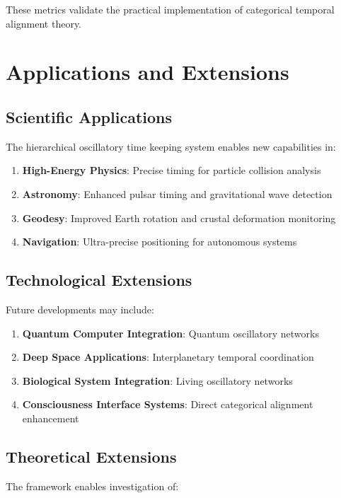 \documentclass[12pt,a4paper]{article}
\begin{document}
These metrics validate the practical implementation of categorical temporal alignment theory.

\section{Applications and Extensions}

\subsection{Scientific Applications}

The hierarchical oscillatory time keeping system enables new capabilities in:

\begin{enumerate}
\item \textbf{High-Energy Physics}: Precise timing for particle collision analysis
\item \textbf{Astronomy}: Enhanced pulsar timing and gravitational wave detection
\item \textbf{Geodesy}: Improved Earth rotation and crustal deformation monitoring
\item \textbf{Navigation}: Ultra-precise positioning for autonomous systems
\end{enumerate}

\subsection{Technological Extensions}

Future developments may include:

\begin{enumerate}
\item \textbf{Quantum Computer Integration}: Quantum oscillatory networks
\item \textbf{Deep Space Applications}: Interplanetary temporal coordination
\item \textbf{Biological System Integration}: Living oscillatory networks
\item \textbf{Consciousness Interface Systems}: Direct categorical alignment enhancement
\end{enumerate}

\subsection{Theoretical Extensions}

The framework enables investigation of:
\end{document}
